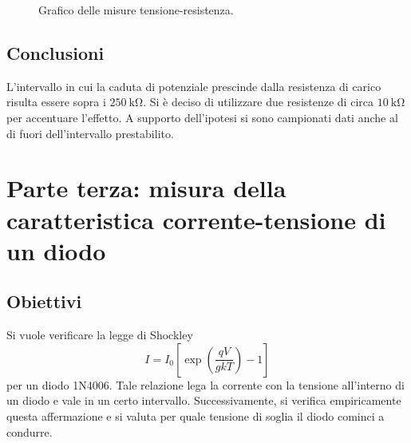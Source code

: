 \documentclass[a4paper]{article}
\begin{document}
\begin{figure}[H]
	\centering
    	\hspace*{-0.75cm}
	\caption{Grafico delle misure tensione-resistenza.}
	\label{fig:part_resist}
\end{figure}

\subsection{Conclusioni}
L'intervallo in cui la caduta di potenziale prescinde dalla resistenza di carico risulta essere sopra i $\SI{250}{\kilo\ohm}$. Si è deciso di utilizzare due resistenze di circa $\SI{10}{\kilo\ohm}$ per accentuare l'effetto. A supporto dell'ipotesi si sono campionati dati anche al di fuori dell'intervallo prestabilito.
\clearpage

\section{Parte terza: misura della caratteristica corrente-tensione di un diodo}
\subsection{Obiettivi}
Si vuole verificare la legge di Shockley
\[
I = I_0\left[ \exp\left( \frac{qV}{gkT} \right)-1 \right] 
\] 
per un diodo 1N4006. Tale relazione lega la corrente con la tensione all'interno di un diodo e vale in un certo intervallo. Successivamente, si verifica empiricamente questa affermazione e si valuta per quale tensione di soglia il diodo cominci a condurre.
\end{document}
